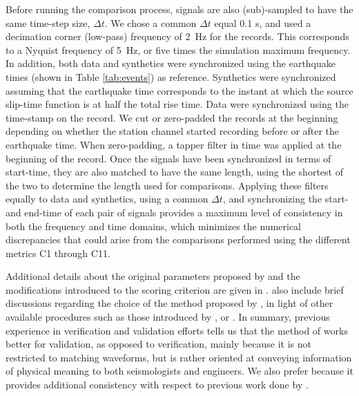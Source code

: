 Before running the comparison process, signals are also (sub)-sampled to have the same time-step size, $\Delta t$. We chose a common $\Delta t$ equal 0.1 s, and used a decimation corner (low-pass) frequency of 2~Hz for the records. This corresponds to a Nyquist frequency of 5~Hz, or five times the simulation maximum frequency. In addition, both data and synthetics were synchronized using the earthquake times (shown in Table \ref{tab:events}) as reference. Synthetics were synchronized assuming that the earthquake time corresponds to the instant at which the source slip-time function is at half the total rise time. Data were synchronized using the time-stamp on the record. We cut or zero-padded the records at the beginning depending on whether the station channel started recording before or after the earthquake time. When zero-padding, a tapper filter in time was applied at the beginning of the record. Once the signals have been synchronized in terms of start-time, they are also matched to have the same length, using the shortest of the two to determine the length used for comparisons. Applying these filters equally to data and synthetics, using a common $\Delta t$, and synchronizing the start- and end-time of each pair of signals provides a maximum level of consistency in both the frequency and time domains, which minimizes the numerical discrepancies that could arise from the comparisons performed using the different metrics C1 through C11.

Additional details about the original parameters proposed by \citet{Anderson_2004_Proc} and the modifications introduced to the scoring criterion are given in \citet{Taborda_2013_BSSA}. \citet{Taborda_2013_BSSA, Taborda_2014_BSSA} also include brief discussions regarding the choice of the method proposed by \citet{Anderson_2004_Proc}, in light of other available procedures such as those introduced by \citet{Kristekova_2006_BSSA}, \citet{Kristekova_2009_GJI} or \citet{Olsen_2010_SRL}. In summary, previous experience in verification and validation efforts tells us that the method of \citet{Anderson_2004_Proc} works better for validation, as opposed to verification, mainly because it is not restricted to matching waveforms, but is rather oriented at conveying information of physical meaning to both seismologists and engineers. We also prefer \citet{Anderson_2004_Proc} because it provides additional consistency with respect to previous work done by \citet{Taborda_2013_BSSA, Taborda_2014_BSSA}.
